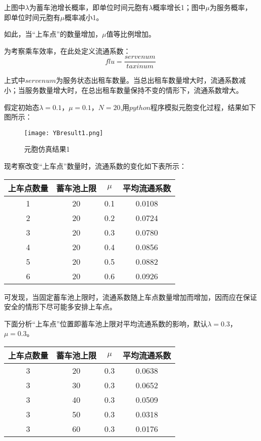 \documentclass[withoutpreface,bwprint]{cumcmthesis} %
\begin{document}
上图中$\lambda$为蓄车池增长概率，即单位时间元胞有$\lambda$概率增长1；图中$\mu$为服务概率，即单位时间元胞有$\mu$概率减小1。

如此，当“上车点”的数量增加，$\mu$值等比例增加。

为考察乘车效率，在此处定义流通系数：
\begin{equation}
	flu=\frac{servenum}{taxinum}
\end{equation}

上式中$servenum$为服务状态出租车数量。当总出租车数量增大时，流通系数减小；当服务数量增大时，在总出租车数量保持不变的情形下，流通系数增大。

假定初始态$\lambda=0.1$，$\mu=0.1$，$N=20$,用$python$程序模拟元胞变化过程，结果如下图所示：
\begin{figure}[!h]
	\centering
	\texttt{[image: YBresult1.png]}
	\caption{元胞仿真结果1}
\end{figure}
\newpage

现考察改变“上车点”数量时，流通系数的变化如下表所示：
\begin{center}
	\begin{tabular}{cccc}
		\hline
		上车点数量 & 蓄车池上限 & $\mu$ & 平均流通系数 \\
		\hline
		1          & 20         & 0.1   & 0.0108       \\
		2          & 20         & 0.2   & 0.0724       \\
		3          & 20         & 0.3   & 0.0780       \\
		4          & 20         & 0.4   & 0.0856       \\
		5          & 20         & 0.5   & 0.0882       \\
		6          & 20         & 0.6   & 0.0926       \\
		\hline
	\end{tabular}
\end{center}

可发现，当固定蓄车池上限时，流通系数随上车点数量增加而增加，因而应在保证安全的情形下尽可能多安排上车点。

下面分析“上车点”位置即蓄车池上限对平均流通系数的影响，默认$\lambda=0.3$，$\mu=0.3$。
\begin{center}
	\begin{tabular}{cccc}
		\hline
		上车点数量 & 蓄车池上限 & $\mu$ & 平均流通系数 \\
		\hline
		3          & 20         & 0.3   & 0.0638       \\
		3          & 30         & 0.3   & 0.0652       \\
		3          & 40         & 0.3   & 0.0509       \\
		3          & 50         & 0.3   & 0.0318       \\
		3          & 60         & 0.3   & 0.0176       \\
		\hline
	\end{tabular}
\end{center}
\end{document}

